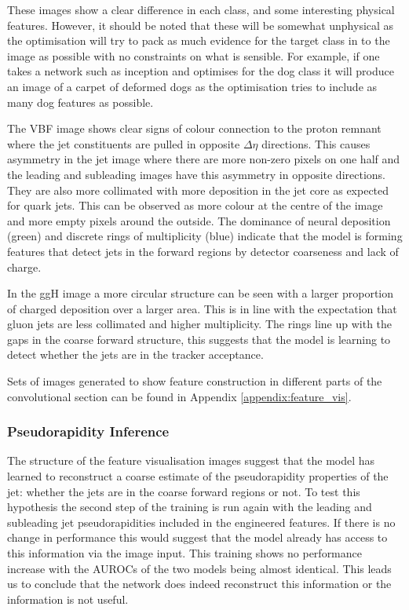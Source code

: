 These images show a clear difference in each class, and some interesting physical features. However, it should be noted that these will be somewhat unphysical as the optimisation will try to pack as much evidence for the target class in to the image as possible with no constraints on what is sensible. For example, if one takes a network such as inception and optimises for the dog class it will produce an image of a carpet of deformed dogs as the optimisation tries to include as many dog features as possible. 


The VBF image shows clear signs of colour connection to the proton remnant where the jet constituents are pulled in opposite $\Delta\eta$ directions. This causes asymmetry in the jet image where there are more non-zero pixels on one half and the leading and subleading images have this asymmetry in opposite directions.
They are also more collimated with more \pt  deposition in the jet core as expected for quark jets. This can be observed as more colour at the centre of the image and more empty pixels around the outside. The dominance of neural \pt deposition (green) and discrete rings of multiplicity (blue) indicate that the model is forming features that detect jets in the forward regions by detector coarseness and lack of charge. 

In the ggH image a more circular structure can be seen with a larger proportion of charged deposition over a larger area. This is in line with the expectation that gluon jets are less collimated and higher multiplicity. The rings line up with the gaps in the coarse forward structure, this suggests that the model is learning to detect whether the jets are in the tracker acceptance. 

Sets of images generated to show feature construction in different parts of the convolutional section can be found in Appendix \ref{appendix:feature_vis}.


\subsubsection{Pseudorapidity Inference}
The structure of the feature visualisation images suggest that the model has learned to reconstruct a coarse estimate of the pseudorapidity properties of the jet: whether the jets are in the coarse forward regions or not. 
To test this hypothesis the second step of the training is run again with the leading and subleading jet pseudorapidities included in the engineered features. If there is no change in performance this would suggest that the model already has access to this information via the image input. This training shows no performance increase with the AUROCs of the two models being almost identical. This leads us to conclude that the network does indeed reconstruct this information or the information is not useful.

